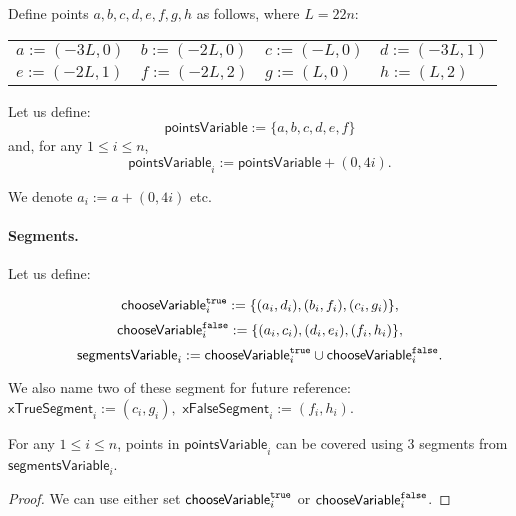 Define points $a,b,c,d,e,f,g,h$ as follows, where $L = 22n$:


\newcommand{\pointsVarNoArg}{\mathsf{pointsVariable} }
\newcommand{\pointsVar}[1]{\mathsf{pointsVariable}_{#1} }
\newcommand{\chooseVar}[2]{\mathsf{chooseVariable}^{#1}_{#2} }
\newcommand{\segmentsVar}[1]{\mathsf{segmentsVariable}_{#1} }



\begin{center}
\begin{tabular}{ l l l l}
	$a := (-3L, 0)$ &
	$b := (-2L, 0)$ & 
	$c := (-L, 0)$ & 
	$d := (-3L, 1)$ \\  
	$e := (-2L, 1)$ & 
	$f := (-2L, 2)$ &
	$g := (L, 0)$ &
	$h := (L, 2)$
\end{tabular}
\end{center}


Let us define:
$$\pointsVarNoArg :=  \{a, b, c, d, e, f\}$$
and, for any $1 \le i \le n$,
$$\pointsVar{i} := \pointsVarNoArg + (0, 4i).$$

We denote $a_i := a + (0,4i)$ etc.

\paragraph{Segments.}

\newcommand{\xTrueSegmentDef}[1]{(c_{#1}, g_{#1})}
\newcommand{\xFalseSegmentDef}[1]{(f_{#1}, h_{#1})}
\newcommand{\xTrueSegment}[1]{\mathsf{xTrueSegment}_{#1}}
\newcommand{\xFalseSegment}[1]{\mathsf{xFalseSegment}_{#1}}
\newcommand{\orTrueSegment}[2]{(t_{#1, #2}, v_{#1, #2})}

Let us define:

$$\chooseVar{\true}{i} :=\{ (a_i, d_i), (b_i, f_i), (c_i, g_i)\},$$
$$\chooseVar{\false}{i} := \{(a_i, c_i), (d_i, e_i), (f_i, h_i)\},$$
$$\segmentsVar{i} := \chooseVar{\true}{i} \cup \chooseVar{\false}{i}.$$

We also name two of these segment for future reference:
$\xTrueSegment{i} := \xTrueSegmentDef{i},$
$\xFalseSegment{i} := \xFalseSegmentDef{i}.$

\begin{lemma}
\label{choose_variables_solution}
For any $1 \le i \le n$, points in $\pointsVar{i}$
can be covered using 3 segments from $\segmentsVar{i}$.
\end{lemma}

\begin{proof}
We can use either set $\chooseVar{\true}{i}$ or $\chooseVar{\false}{i}$.
\end{proof}


